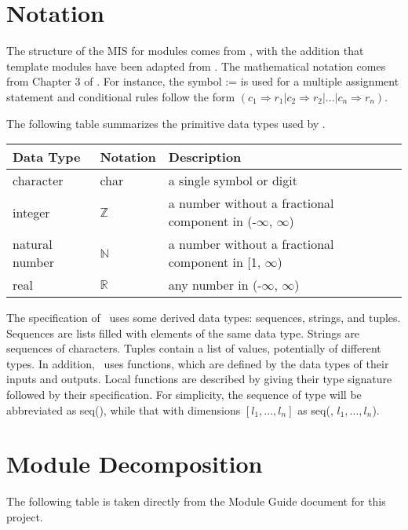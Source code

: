 \documentclass[12pt, titlepage]{article}
\begin{document}
\section{Notation}

The structure of the MIS for modules comes from \citet{HoffmanAndStrooper1995},
with the addition that template modules have been adapted from
\cite{GhezziEtAl2003}.  The mathematical notation comes from Chapter 3 of
\citet{HoffmanAndStrooper1995}.  For instance, the symbol := is used for a
multiple assignment statement and conditional rules follow the form $(c_1
\Rightarrow r_1 | c_2 \Rightarrow r_2 | ... | c_n \Rightarrow r_n )$.

The following table summarizes the primitive data types used by \progname. 

\begin{center}
\renewcommand{\arraystretch}{1.2}
\noindent 
\begin{tabular}{l l p{7.5cm}} 
\toprule 
\textbf{Data Type} & \textbf{Notation} & \textbf{Description}\\ 
\midrule
character & char & a single symbol or digit\\
integer & $\mathbb{Z}$ & a number without a fractional component in (-$\infty$, $\infty$) \\
natural number & $\mathbb{N}$ & a number without a fractional component in [1, $\infty$) \\
real & $\mathbb{R}$ & any number in (-$\infty$, $\infty$)\\
\bottomrule
\end{tabular} 
\end{center}

\noindent
The specification of \progname \ uses some derived data types: sequences, strings, and
tuples. Sequences are lists filled with elements of the same data type. Strings
are sequences of characters. Tuples contain a list of values, potentially of
different types. In addition, \progname \ uses functions, which
are defined by the data types of their inputs and outputs. Local functions are
described by giving their type signature followed by their specification.
For simplicity, the sequence of type  will be abbreviated as seq(), while that with dimensions $[l_1, ..., l_n]$ as seq(, $l_1, ..., l_n$).
\section{Module Decomposition}

The following table is taken directly from the Module Guide document for this project.
\end{document}
